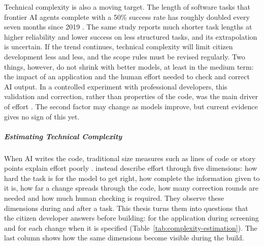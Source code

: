 \documentclass[10pt,a4paper]{article}
\begin{document}
Technical complexity is also a moving target. The length of software
tasks that frontier AI agents complete with a 50\% success rate has
roughly doubled every seven months since 2019 \parencite{kwa2025}. The
same study reports much shorter task lengths at higher reliability and
lower success on less structured tasks, and its extrapolation is
uncertain. If the trend continues, technical complexity will limit
citizen development less and less, and the scope rules must be revised
regularly. Two things, however, do not shrink with better models, at least in the
medium term: the impact of an application and the human effort needed
to check and correct AI output. In a controlled experiment with
professional developers, this validation and correction, rather than
properties of the code, was the main driver of effort
\parencite{alaswad2026hybrid}. The second factor may change as models
improve, but current evidence gives no sign of this yet.

\subparagraph{Estimating Technical Complexity}

When AI writes the code, traditional size measures such as lines of
code or story points explain effort poorly
\parencite{alaswad2026framework,alaswad2026hybrid}.
\textcite{alaswad2026framework} instead describe effort through five
dimensions: how hard the task is for the model to get right, how
complete the information given to it is, how far a change spreads
through the code, how many correction rounds are needed and how much
human checking is required. They observe these dimensions during and
after a task. This thesis turns them into questions that the citizen
developer answers before building: for the application during
screening and for each change when it is specified
(Table~\ref{tab:complexity-estimation}). The last column shows how the
same dimensions become visible during the build.
\end{document}
